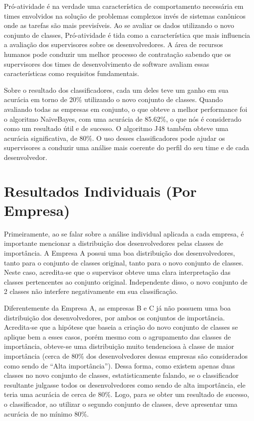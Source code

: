 Pró-atividade é na verdade uma característica de comportamento necessária em times envolvidos na solução de problemas complexos invés de sistemas canônicos onde as tarefas são mais previsíveis. Ao se avaliar os dados utilizando o novo conjunto de classes, Pró-atividade é tida como a característica que mais influencia a avaliação dos supervisores sobre os desenvolvedores. A área de recursos humanos pode conduzir um melhor processo de contratação sabendo que os supervisores dos times de desenvolvimento de software avaliam essas características como requisitos fundamentais.

Sobre o resultado dos classificadores, cada um deles teve um ganho em sua acurácia em torno de 20\% utilizando o novo conjunto de classes. Quando avaliando todas as empresas em conjunto, o que obteve a melhor performance foi o algoritmo NaïveBayes, com uma acurácia de 85.62\%, o que nós é considerado como um resultado útil e de sucesso. O algoritmo J48 também obteve uma acurácia significativa, de 80\%. O uso desses classificadores pode ajudar os supervisores a conduzir uma análise mais coerente do perfil do seu time e de cada desenvolvedor.

\section{Resultados Individuais (Por Empresa)}
Primeiramente, ao se falar sobre a análise individual aplicada a cada empresa, é importante mencionar a distribuição dos desenvolvedores pelas classes de importância. A Empresa A possui uma boa distribuição dos desenvolvedores, tanto para o conjunto de classes original, tanto para o novo conjunto de classes. Neste caso, acredita-se que o supervisor obteve uma clara interpretação das classes pertencentes ao conjunto original. Independente disso, o novo conjunto de 2 classes não interfere negativamente em sua classificação.

Diferentemente da Empresa A, as empresas B e C já não possuem uma boa distribuição dos desenvolvedores, por ambos os conjuntos de importância. Acredita-se que a hipótese que baseia a criação do novo conjunto de classes se aplique bem a esses casos, porém mesmo com o agrupamento das classes de importância, obteve-se uma distribuição muito tendenciosa à classe de maior importância (cerca de 80\% dos desenvolvedores dessas empresas são considerados como sendo de “Alta importância”). Dessa forma, como existem apenas duas classes no novo conjunto de classes, estatisticamente falando, se o classificador resultante julgasse todos os desenvolvedores como sendo de alta importância, ele teria uma acurácia de cerca de 80\%. Logo, para se obter um resultado de sucesso, o classificador, ao utilizar o segundo conjunto de classes, deve apresentar uma acurácia de no mínimo 80\%.

